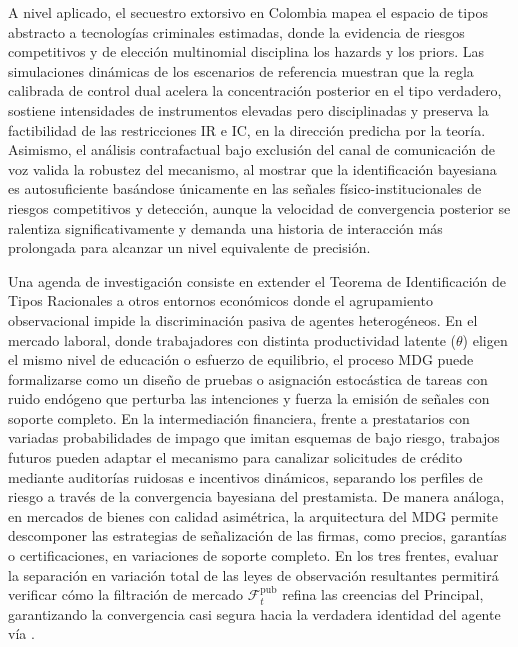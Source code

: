 \documentclass[pdflatex,sn-mathphys-ay]{sn-jnl}
\theoremstyle{thmstyleone}
\theoremstyle{thmstyletwo}
\theoremstyle{thmstylethree}
\newcommand{\1}{\mathbf{1}}
\begin{document}
A nivel aplicado, el secuestro extorsivo en Colombia mapea el espacio de tipos abstracto a tecnologías criminales estimadas, donde la evidencia de riesgos competitivos y de elección multinomial disciplina los hazards y los priors. Las simulaciones dinámicas de los escenarios de referencia muestran que la regla calibrada de control dual acelera la concentración posterior en el tipo verdadero, sostiene intensidades de instrumentos elevadas pero disciplinadas y preserva la factibilidad de las restricciones IR e IC, en la dirección predicha por la teoría. Asimismo, el análisis contrafactual bajo exclusión del canal de comunicación de voz valida la robustez del mecanismo, al mostrar que la identificación bayesiana es autosuficiente basándose únicamente en las señales físico-institucionales de riesgos competitivos y detección, aunque la velocidad de convergencia posterior se ralentiza significativamente y demanda una historia de interacción más prolongada para alcanzar un nivel equivalente de precisión.

Una agenda de investigación consiste en extender el Teorema de Identificación de Tipos Racionales a otros entornos económicos donde el agrupamiento observacional impide la discriminación pasiva de agentes heterogéneos. En el mercado laboral, donde trabajadores con distinta productividad latente ($\theta$) eligen el mismo nivel de educación o esfuerzo de equilibrio, el proceso MDG puede formalizarse como un diseño de pruebas o asignación estocástica de tareas con ruido endógeno que perturba las intenciones y fuerza la emisión de señales con soporte completo. En la intermediación financiera, frente a prestatarios con variadas probabilidades de impago que imitan esquemas de bajo riesgo, trabajos futuros pueden adaptar el mecanismo para canalizar solicitudes de crédito mediante auditorías ruidosas e incentivos dinámicos, separando los perfiles de riesgo a través de la convergencia bayesiana del prestamista. De manera análoga, en mercados de bienes con calidad asimétrica, la arquitectura del MDG permite descomponer las estrategias de señalización de las firmas, como precios, garantías o certificaciones, en variaciones de soporte completo. En los tres frentes, evaluar la separación en variación total de las leyes de observación resultantes permitirá verificar cómo la filtración de mercado $\mathcal{F}_t^{\mathrm{pub}}$ refina las creencias del Principal, garantizando la convergencia casi segura hacia la verdadera identidad del agente vía \citet{Kakutani1948}.


\backmatter
\end{document}
